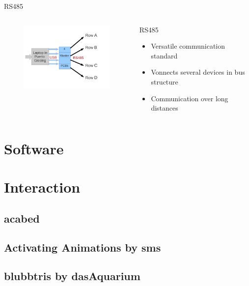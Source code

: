 \documentclass{beamer}
\begin{document}
  \begin{frame}{RS485}
    \begin{columns}
       \begin{column}{6cm}
        \begin{figure}
        \includegraphics[width=6cm, clip, trim= 1cm 3cm 4cm 2.5cm]{bilder/laptop.pdf}
        \end{figure}
      \end{column}
      \begin{column}{5cm}
      \begin{block}{RS485}
        \begin{itemize}
        \item Versatile communication standard
        \item Vonnects several devices in bus structure
        \item Communication over long distances
        \end{itemize}
      \end{block}
     \end{column}
   \end{columns}
  \end{frame}

\section{Software}
\section{Interaction}
    \subsection{acabed}
    \subsection{Activating Animations by sms}
    \subsection{blubbtris by dasAquarium}
\end{document}
